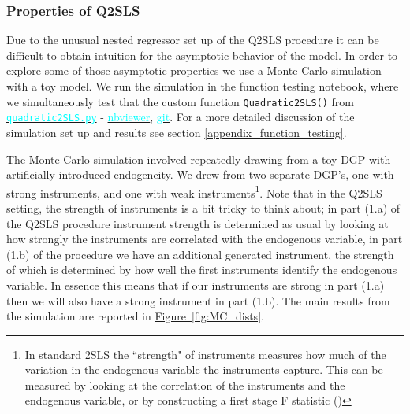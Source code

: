 \documentclass[12pt]{article}
\newcommand{\inlinecode}{\texttt}
\begin{document}
\subsubsection{Properties of Q2SLS} \label{q2sls_properties}
Due to the unusual nested regressor set up of the Q2SLS procedure it can be difficult to obtain intuition for the asymptotic behavior of the model. In order to explore some of those asymptotic properties we use a Monte Carlo simulation with a toy model. We run the simulation in the function testing notebook, where we simultaneously test that the custom function \inlinecode{Quadratic2SLS()} from \href{https://github.com/nadavtadelis/Reproducible_Metrics/blob/master/quadratic2SLS.py}{\textcolor{cyan}{\inlinecode{quadratic2SLS.py}}} - \href{https://nbviewer.jupyter.org/github/nadavtadelis/Reproducible_Metrics/blob/master/function_testing.ipynb}{\textcolor{cyan}{nbviewer}}, \href{https://github.com/nadavtadelis/Reproducible_Metrics/blob/master/function_testing.ipynb}{\textcolor{cyan}{git}}. For a more detailed discussion of the simulation set up and results see section \ref{appendix_function_testing}.

The Monte Carlo simulation involved repeatedly drawing from a toy DGP with artificially introduced endogeneity. We drew from two separate DGP's, one with strong instruments, and one with weak instruments\footnote{In standard 2SLS the ``strength" of instruments measures how much of the variation in the endogenous variable the instruments capture. This can be measured by looking at the correlation of the instruments and the endogenous variable, or by constructing a first stage F statistic (\cite{harmless})}. Note that in the Q2SLS setting, the strength of instruments is a bit tricky to think about; in part (1.a) of the Q2SLS procedure instrument strength is determined as usual by looking at how strongly the instruments are correlated with the endogenous variable, in part (1.b) of the procedure we have an additional generated instrument, the strength of which is determined by how well the first instruments identify the endogenous variable. In essence this means that if our instruments are strong in part (1.a) then we will also have a strong instrument in part (1.b). The main results from the simulation are reported in \hyperref[fig:MC_dists]{Figure~\ref*{fig:MC_dists}}.
\end{document}
